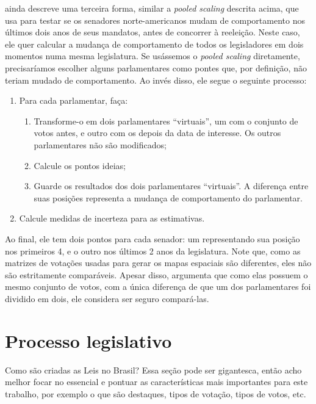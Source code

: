 \documentclass[a4paper,titlepage]{ppgi}\usepackage[]{graphicx}\usepackage[]{color}
\begin{document}
 ainda descreve uma terceira forma, similar a
\emph{pooled scaling} descrita acima, que usa para testar se os senadores
norte-americanos mudam de comportamento nos últimos dois anos de seus mandatos,
antes de concorrer à reeleição. Neste caso, ele quer calcular a mudança de
comportamento de todos os legisladores em dois momentos numa mesma legislatura.
Se usássemos o \emph{pooled scaling} diretamente, precisaríamos escolher alguns
parlamentares como pontes que, por definição, não teriam mudado de
comportamento. Ao invés disso, ele segue o seguinte processo:

\begin{enumerate}
  \item Para cada parlamentar, faça:
    \begin{enumerate}
      \item Transforme-o em dois parlamentares ``virtuais'', um com o conjunto
de votos antes, e outro com os depois da data de interesse. Os outros
parlamentares não são modificados;
      \item Calcule os pontos ideias;
      \item Guarde os resultados dos dois parlamentares ``virtuais''. A
diferença entre suas posições representa a mudança de comportamento do
parlamentar.
    \end{enumerate}
  \item Calcule medidas de incerteza para as estimativas.
\end{enumerate}

Ao final, ele tem dois pontos para cada senador: um representando sua posição
nos primeiros 4, e o outro nos últimos 2 anos da legislatura. Note que, como as
matrizes de votações usadas para gerar os mapas espaciais são diferentes, eles
não são estritamente comparáveis. Apesar disso, 
argumenta que como elas possuem o mesmo conjunto de votos, com a única
diferença de que um dos parlamentares foi dividido em dois, ele considera ser
seguro compará-las.

\section{Processo legislativo}

Como são criadas as Leis no Brasil? Essa seção pode ser gigantesca, então acho melhor focar no essencial e pontuar as características mais importantes para este trabalho, por exemplo o que são destaques, tipos de votação, tipos de votos, etc.
\end{document}

